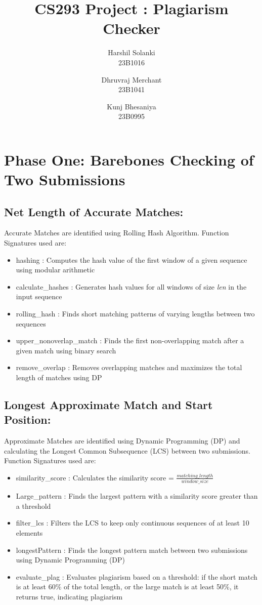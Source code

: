 \documentclass{article}
\title{CS293 Project : Plagiarism Checker}
\author{Harshil Solanki \\{ 23B1016}
\and
Dhruvraj Merchant \\{ 23B1041}
\and
Kunj Bhesaniya \\{23B0995}}
\begin{document}
\maketitle
\section{Phase One: Barebones Checking of Two Submissions} \vspace{-0.3cm}
\subsection{Net Length of Accurate Matches:}
Accurate Matches are identified using Rolling Hash Algorithm. Function Signatures used are:
\begin{itemize}
    \item hashing : Computes the hash value of the first window of a given sequence using modular arithmetic
    \item calculate\_hashes : Generates hash values for all windows of size \textit{len} in the input sequence
    \item rolling\_hash : Finds short matching patterns of varying lengths between two sequences
    \item upper\_nonoverlap\_match : Finds the first non-overlapping match after a given match using binary search
    \item remove\_overlap : Removes overlapping matches and maximizes the total length of matches using DP
\end{itemize}

\subsection{Longest Approximate Match and Start Position:}
Approximate Matches are identified using Dynamic Programming (DP) and calculating the Longest Common Subsequence (LCS) between two submissions. Function Signatures used are:
\begin{itemize}
    \item similarity\_score : Calculates the similarity score = $\frac{matching\_length}{window\_size}$
    \item Large\_pattern : Finds the largest pattern with a similarity score greater than a threshold
    \item filter\_lcs : Filters the LCS to keep only continuous sequences of at least 10 elements
    \item longestPattern : Finds the longest pattern match between two submissions using Dynamic Programming (DP)
    \item evaluate\_plag : Evaluates plagiarism based on a threshold: if the short match is at least 60\% of the total length, or the large match is at least 50\%, it returns true, indicating plagiarism
\end{itemize}
\end{document}
